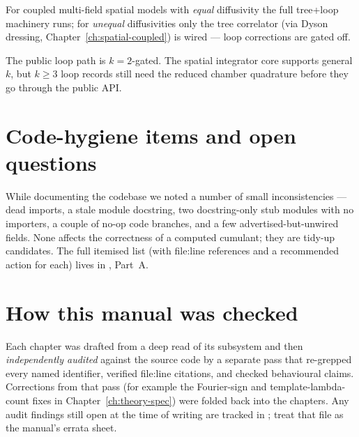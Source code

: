 \begin{description}[leftmargin=0pt,style=nextline]
  \item[Spatial coupled fields with unequal diffusivities: tree only]
        For coupled multi-field spatial models with \emph{equal} diffusivity the
        full tree+loop machinery runs; for \emph{unequal} diffusivities only the
        tree correlator (via Dyson dressing, Chapter~\ref{ch:spatial-coupled}) is
        wired --- loop corrections are gated off.

  \item[Spatial $k\ge3$ loop path]
        The public  loop path is $k=2$-gated.  The
        spatial integrator core supports general $k$, but $k\ge3$ loop records
        still need the reduced chamber quadrature before they go through the
        public API.

\end{description}

\section{Code-hygiene items and open questions}

While documenting the codebase we noted a number of small inconsistencies ---
dead imports, a stale module docstring, two docstring-only stub modules with no
importers, a couple of no-op code branches, and a few advertised-but-unwired
 fields.  None affects the correctness of a computed cumulant; they
are tidy-up candidates.  The full itemised list (with file:line references and a
recommended action for each) lives in ,
Part~A.

\section{How this manual was checked}

Each chapter was drafted from a deep read of its subsystem and then
\emph{independently audited} against the source code by a separate pass that
re-grepped every named identifier, verified file:line citations, and checked
behavioural claims.  Corrections from that pass (for example the Fourier-sign and
template-lambda-count fixes in Chapter~\ref{ch:theory-spec}) were folded back
into the chapters.  Any audit findings still open at the time of writing are
tracked in ; treat that file as the manual's
errata sheet.

